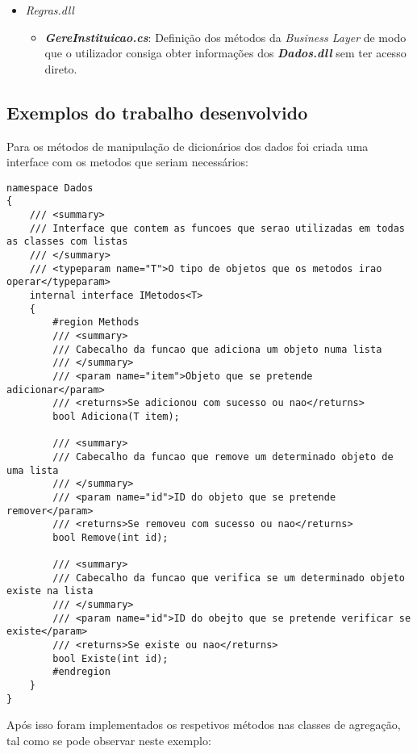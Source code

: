 \documentclass[11pt]{scrartcl} %
\begin{document}
\begin{itemize}
	\item \textit{Regras.dll}
	\begin{itemize}
		\item \emph{\textbf{GereInstituicao.cs}}: Definição dos métodos da \textit{Business Layer} de modo que o utilizador consiga obter informações dos \emph{\textbf{Dados.dll}} sem ter acesso direto.
	\end{itemize}
\end{itemize}

\subsection{Exemplos do trabalho desenvolvido}

Para os métodos de manipulação de dicionários dos dados foi criada uma interface com os metodos que seriam necessários:
\begin{lstlisting}[language={[Sharp]C}, caption={Demonstração da Interface criada}, label={Interface criada}]
namespace Dados
{
	/// <summary>
	/// Interface que contem as funcoes que serao utilizadas em todas as classes com listas
	/// </summary>
	/// <typeparam name="T">O tipo de objetos que os metodos irao operar</typeparam>
	internal interface IMetodos<T>
	{
		#region Methods
		/// <summary>
		/// Cabecalho da funcao que adiciona um objeto numa lista
		/// </summary>
		/// <param name="item">Objeto que se pretende adicionar</param>
		/// <returns>Se adicionou com sucesso ou nao</returns>
		bool Adiciona(T item);
		
		/// <summary>
		/// Cabecalho da funcao que remove um determinado objeto de uma lista
		/// </summary>
		/// <param name="id">ID do objeto que se pretende remover</param>
		/// <returns>Se removeu com sucesso ou nao</returns>
		bool Remove(int id);
		
		/// <summary>
		/// Cabecalho da funcao que verifica se um determinado objeto existe na lista
		/// </summary>
		/// <param name="id">ID do obejto que se pretende verificar se existe</param>
		/// <returns>Se existe ou nao</returns>
		bool Existe(int id);
		#endregion
	}
}
\end{lstlisting}

Após isso foram implementados os respetivos métodos nas classes de agregação, tal como se pode observar neste exemplo:
\end{document}
